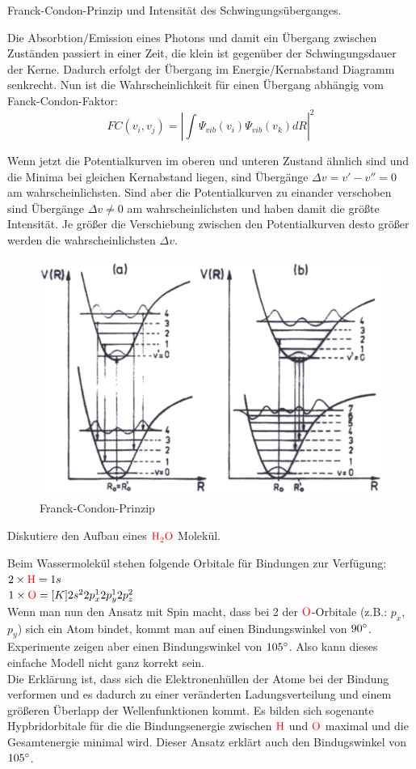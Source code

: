 \documentclass[a5paper,12pt,ngerman,grid=front %
,print
]{kartei}
\let\oldce\ce
\renewcommand*{\ce}[1]{\begingroup\color{red}\oldce{#1}\endgroup}
\begin{document}
	\begin{karte}{
		Franck-Condon-Prinzip und Intensität des Schwingungsüberganges.
		}
		
		Die Absorbtion/Emission eines Photons und damit ein Übergang zwischen Zuständen passiert in einer Zeit, die klein ist gegenüber der Schwingungsdauer der Kerne. Dadurch erfolgt der Übergang im Energie/Kernabstand Diagramm senkrecht. Nun ist die Wahrscheinlichkeit für einen Übergang abhängig vom Fanck-Condon-Faktor:
		$$  FC(v_i, v_j) = \left|   \int  \Psi_{ vib } (v_i)  \Psi_{ vib } (v_k)  dR    \right|^2   $$
		
		Wenn jetzt die Potentialkurven im oberen und unteren Zustand ähnlich sind und die Minima bei gleichen Kernabstand liegen, sind Übergänge $ \Delta v = v'- v''= 0 $ am wahrscheinlichsten. Sind aber die Potentialkurven zu einander verschoben sind Übergänge $ \Delta v \neq 0 $ am wahrscheinlichsten und haben damit die größte Intensität. Je größer die Verschiebung zwischen den Potentialkurven desto größer werden die wahrscheinlichsten $\Delta v$.
		
		\begin{figure}[htbp]
			\centering
			\includegraphics[width=0.4\linewidth]{./images/17_FCP}
			\caption{Franck-Condon-Prinzip}
		\end{figure}
		
		
	\end{karte}


	\begin{karte}{
		Diskutiere den Aufbau eines $\ce{H2O}$ Molekül.
		}
		
		Beim Wassermolekül stehen folgende Orbitale für Bindungen zur Verfügung: \\
		$  2 \times \ce{H} = 1s  $ \\
		$  1 \times \ce{O} = [K] 2s^2 2p_x^1 2p_y^1 2p_z^2  $ \\
		Wenn man nun den Ansatz mit Spin macht, dass bei 2 der $ \ce{O} $-Orbitale (z.B.: $p_x$, $p_y$) sich ein  Atom bindet, kommt man auf einen Bindungswinkel von $90\degree$.
		Experimente zeigen aber einen Bindungswinkel von $105\degree$. Also kann dieses einfache Modell nicht ganz korrekt sein. \\
		
		Die Erklärung ist, dass sich die Elektronenhüllen der Atome bei der Bindung verformen und es dadurch zu einer veränderten Ladungsverteilung und einem größeren Überlapp der Wellenfunktionen kommt. Es bilden sich sogenante Hypbridorbitale für die die Bindungsenergie zwischen $\ce{H}$ und $\ce{O}$ maximal und die Gesamtenergie minimal wird. Dieser Ansatz erklärt auch den Bindugswinkel von $105\degree$.
		
		
	\end{karte}
\end{document}
